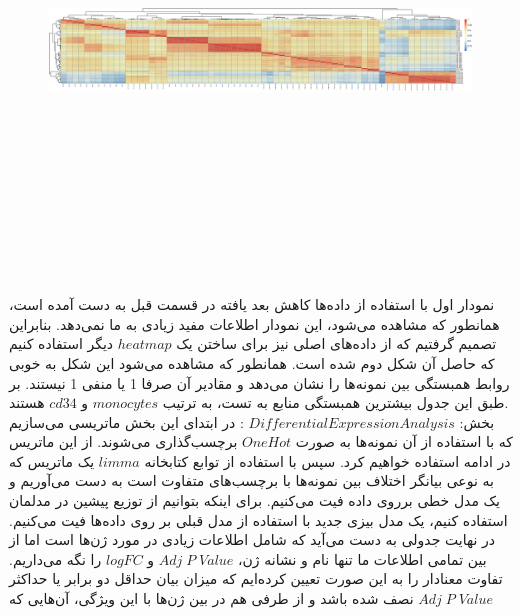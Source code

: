 \documentclass[a4paper,12pt]{article}
\begin{document}
\begin{figure}[H]
 \centering
  \includegraphics[width=\linewidth , height=12cm]{../../results/heatmap.png}
\end{figure}
نمودار اول با استفاده از داده‌ها کاهش بعد یافته در قسمت قبل به دست آمده است، همانطور که مشاهده می‌شود، این نمودار اطلاعات مفید زیادی به ما نمی‌دهد. بنابراین تصمیم گرفتیم که از داده‌های اصلی نیز برای ساختن یک $heatmap$ دیگر استفاده کنیم که حاصل آن شکل دوم شده است. همانطور که مشاهده می‌شود این شکل به خوبی روابط همبستگی بین نمونه‌ها را نشان می‌دهد و مقادیر آن صرفا 1 یا منفی 1 نیستند. بر طبق این جدول بیشترین همبستگی منابع به تست، به ترتیب $monocytes$ و $cd34$ هستند.\\
بخش:
$Differential Expression Analysis$ :
در ابتدای این بخش ماتریسی می‌سازیم که با استفاده از آن نمونه‌ها به صورت
$OneHot$
برچسب‌گذاری می‌شوند. از این ماتریس در ادامه استفاده خواهیم کرد. سپس با استفاده از توابع کتابخانه
$limma$
یک ماتریس که به نوعی بیانگر اختلاف بین نمونه‌ها با برچسب‌های متفاوت است به دست می‌آوریم و
یک مدل خطی برروی داده فیت می‌کنیم. برای اینکه بتوانیم از توزیع‌ پیشین در مدلمان استفاده کنیم، یک مدل بیزی جدید با استفاده از مدل قبلی بر روی داده‌ها فیت می‌کنیم. در نهایت جدولی به دست می‌آید که شامل اطلاعات زیادی در مورد ژن‌ها است اما از بین تمامی اطلاعات ما تنها نام و نشانه ژن،
$Adj\;P\;Value$
و
$logFC$
را نگه می‌داریم. تفاوت معنادار را به این صورت تعیین کرده‌ایم که میزان بیان حداقل دو برابر یا حداکثر نصف شده باشد و از طرفی هم در بین ژن‌ها با این ویژگی، آن‌هایی که
$Adj\;P\;Value$
\end{document}
